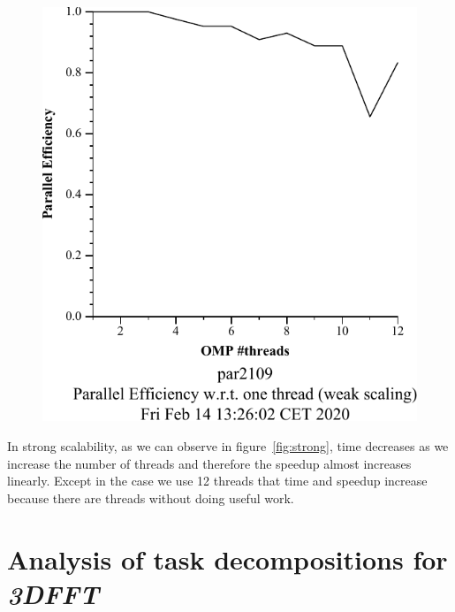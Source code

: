 \begin{figure}[H]
\begin{minipage}{.5\textwidth}
  \includegraphics[width=.7\linewidth]{./data/pi/pi_omp-100000000-1-12-3-weak-boada-3.pdf}
  \label{fig:weak}
\end{minipage}
\end{figure}

In strong scalability, as we can observe in figure~\ref{fig:strong}, time decreases as we increase the number of threads and therefore the speedup almost increases linearly. Except in the case we use 12 threads that time and speedup increase because there are threads without doing useful work.





\section{Analysis of task decompositions for \emph{3DFFT}}%
\label{sec:analysis_of_task_decompositions_for_3dfft}


